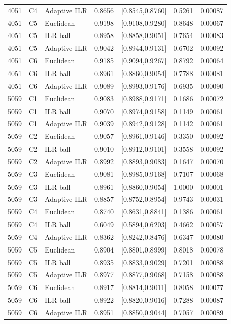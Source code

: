 \documentclass{article}
\begin{document}
{\begin{longtable}{rrlrrrr}
4051 & C4 & Adaptive ILR & 0.8656 & [0.8545,0.8760] & 0.5261 & 0.00087 \\
4051 & C5 & Euclidean & 0.9198 & [0.9108,0.9280] & 0.8648 & 0.00067 \\
4051 & C5 & ILR ball & 0.8958 & [0.8858,0.9051] & 0.7654 & 0.00083 \\
4051 & C5 & Adaptive ILR & 0.9042 & [0.8944,0.9131] & 0.6702 & 0.00092 \\
4051 & C6 & Euclidean & 0.9185 & [0.9094,0.9267] & 0.8792 & 0.00064 \\
4051 & C6 & ILR ball & 0.8961 & [0.8860,0.9054] & 0.7788 & 0.00081 \\
4051 & C6 & Adaptive ILR & 0.9089 & [0.8993,0.9176] & 0.6935 & 0.00090 \\
5059 & C1 & Euclidean & 0.9083 & [0.8988,0.9171] & 0.1686 & 0.00072 \\
5059 & C1 & ILR ball & 0.9070 & [0.8974,0.9158] & 0.1149 & 0.00061 \\
5059 & C1 & Adaptive ILR & 0.9039 & [0.8942,0.9128] & 0.1142 & 0.00061 \\
5059 & C2 & Euclidean & 0.9057 & [0.8961,0.9146] & 0.3350 & 0.00092 \\
5059 & C2 & ILR ball & 0.9010 & [0.8912,0.9101] & 0.3558 & 0.00092 \\
5059 & C2 & Adaptive ILR & 0.8992 & [0.8893,0.9083] & 0.1647 & 0.00070 \\
5059 & C3 & Euclidean & 0.9081 & [0.8985,0.9168] & 0.7107 & 0.00068 \\
5059 & C3 & ILR ball & 0.8961 & [0.8860,0.9054] & 1.0000 & 0.00001 \\
5059 & C3 & Adaptive ILR & 0.8857 & [0.8752,0.8954] & 0.9743 & 0.00031 \\
5059 & C4 & Euclidean & 0.8740 & [0.8631,0.8841] & 0.1386 & 0.00061 \\
5059 & C4 & ILR ball & 0.6049 & [0.5894,0.6203] & 0.4662 & 0.00057 \\
5059 & C4 & Adaptive ILR & 0.8362 & [0.8242,0.8476] & 0.6347 & 0.00080 \\
5059 & C5 & Euclidean & 0.8904 & [0.8801,0.8999] & 0.8018 & 0.00078 \\
5059 & C5 & ILR ball & 0.8935 & [0.8833,0.9029] & 0.7201 & 0.00088 \\
5059 & C5 & Adaptive ILR & 0.8977 & [0.8877,0.9068] & 0.7158 & 0.00088 \\
5059 & C6 & Euclidean & 0.8917 & [0.8814,0.9011] & 0.8058 & 0.00077 \\
5059 & C6 & ILR ball & 0.8922 & [0.8820,0.9016] & 0.7288 & 0.00087 \\
5059 & C6 & Adaptive ILR & 0.8951 & [0.8850,0.9044] & 0.7057 & 0.00089 \\
\bottomrule
\end{longtable}

}
\end{document}
